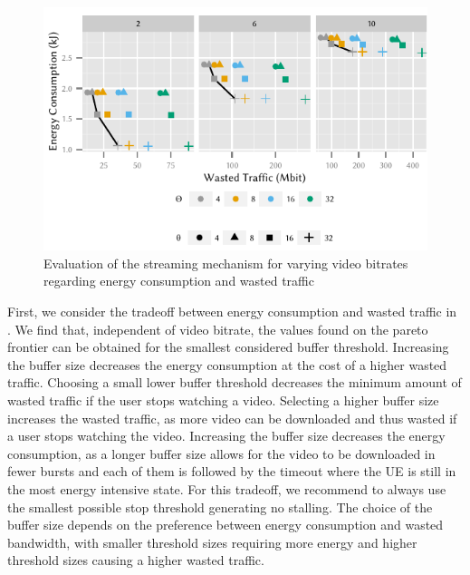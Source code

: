 \begin{figure}
  \centering
  \includegraphics{application/lte_video/trade_offs/figures/energy2lostData}
  \caption{Evaluation of the streaming mechanism for varying video bitrates regarding energy consumption and wasted traffic}
  \label{fig:application:lte_video:numerical_evaluation:trade_offs:energy2lostData}
\end{figure}


First, we consider the tradeoff between energy consumption and wasted traffic in .
We find that, independent of video bitrate, the values found on the pareto frontier can be obtained for the smallest considered buffer threshold.
Increasing the buffer size decreases the energy consumption at the cost of a higher wasted traffic.
Choosing a small lower buffer threshold \bufferlower decreases the minimum amount of wasted traffic if the user stops watching a video.
Selecting a higher buffer size \buffersize  increases the wasted traffic, as more video can be downloaded and thus wasted if a user stops watching the video.
Increasing the buffer size \buffersize decreases the energy consumption, as a longer buffer size allows for the video to be downloaded in fewer bursts and each of them is followed by the \tidle timeout where the \gls{UE} is still in the most energy intensive \rrcconnected state.
For this tradeoff, we recommend to always use the smallest possible stop threshold generating no stalling.
The choice of the buffer size depends on the preference between energy consumption and wasted bandwidth, with smaller threshold sizes requiring more energy and higher threshold sizes causing a higher wasted traffic.

